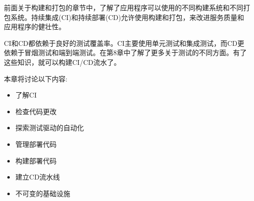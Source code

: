 

前面关于构建和打包的章节中，了解了应用程序可以使用的不同构建系统和不同打包系统。持续集成(CI)和持续部署(CD)允许使用构建和打包，来改进服务质量和应用程序的健壮性。

CI和CD都依赖于良好的测试覆盖率。CI主要使用单元测试和集成测试，而CD更依赖于冒烟测试和端到端测试。在第8章中了解了更多关于测试的不同方面。有了这些知识，就可以构建CI/CD流水了。

本章将讨论以下内容:

\begin{itemize}
\item 
了解CI

\item 
检查代码更改

\item 
探索测试驱动的自动化

\item 
管理部署代码

\item 
构建部署代码

\item 
建立CD流水线

\item 
不可变的基础设施
\end{itemize}
